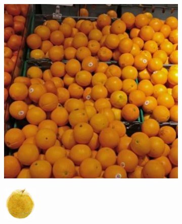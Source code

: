 \begin{figure}[t]
\begin{subfigure}[b]{0.14\textwidth}
		\caption{}
		\label{subfig:oatgurt-decoded}
	\end{subfigure} 
	\\[1mm] 
	\begin{subfigure}[b]{0.14\textwidth}
		\centering
		\includegraphics[width=\textwidth]{PaperA/decoded-image-figure/Orange_056.jpg}
		\caption{}
		\label{subfig:orange-natural}
	\end{subfigure} %
	\begin{subfigure}[b]{0.14\textwidth}
		\centering
		\includegraphics[width=\textwidth]{PaperA/decoded-image-figure/densenet_nov11/Orange_decoded.png}

\end{subfigure}
\end{figure}
